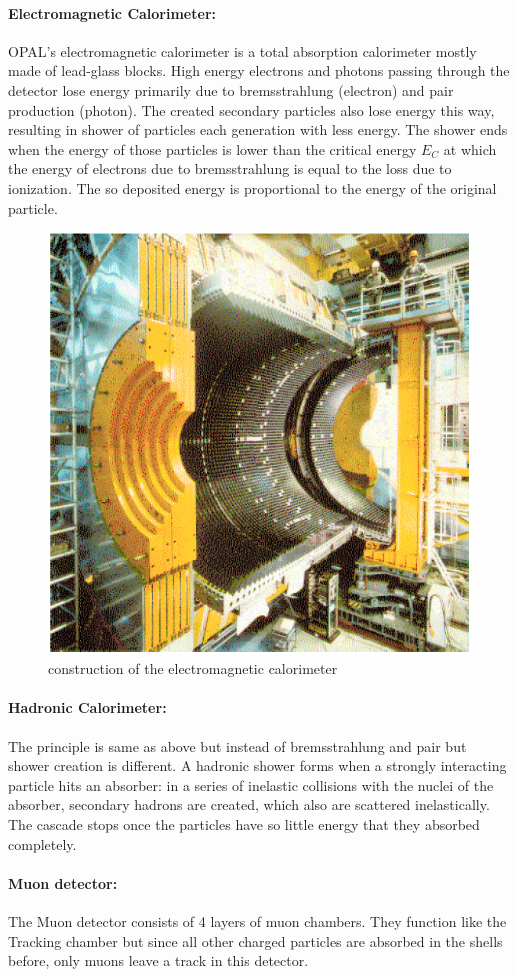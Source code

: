\paragraph{Electromagnetic Calorimeter:}
OPAL's electromagnetic calorimeter is a total absorption calorimeter mostly made of lead-glass blocks\cite{cern}. High energy electrons and photons passing through the detector lose energy primarily due to bremsstrahlung (electron) and pair production (photon). The created secondary particles also lose energy this way, resulting in shower of particles each generation with less energy. The shower ends when the energy of those particles is lower than the critical energy $E_C$ at which the energy of electrons due to bremsstrahlung is equal to the loss due to ionization. The so deposited energy is proportional to the energy of the original particle\cite{muenchen}.
\begin{figure}[h]
\centering
\includegraphics[width=1.0\linewidth]{"graphics/elektromagnetisches kaloriemeter"}
\caption[electromagnetic calorimeter]{construction of the electromagnetic calorimeter}
\label{fig:elektromagnetischeskaloriemeter}
\end{figure}

\paragraph{Hadronic Calorimeter:}
The principle is same as above but instead of bremsstrahlung and pair but shower creation is different. A hadronic shower forms when a strongly interacting particle hits an absorber: in a series of inelastic collisions with the nuclei of the absorber, secondary hadrons are created, which also are scattered inelastically. The cascade stops once the particles have so little energy that they absorbed completely.
\paragraph{Muon detector:}
The Muon detector consists of 4 layers of muon chambers. They function like the Tracking chamber but since all other charged particles are absorbed in the shells before, only muons leave a track in this detector.\cite{muenchen}